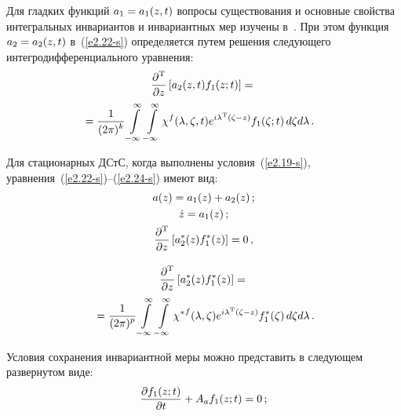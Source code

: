 \begin{multicols}{2}
Для гладких функций $a_1\hm=a_1(z,t)$ вопросы существования и основные
свойства интегральных инвариантов и инвариантных мер изучены в~\cite{23-s, 24-s}.
При этом  функция $a_2 \hm= a_2(z,t)$ в~(\ref{e2.22-s})
определяется путем решения следующего интегродифференциального уравнения:
    \begin{multline}
    \fr{\prt^{\mathrm{T}}}{\prt z}\lk a_2 (z,t) f_1(z;t) \rk ={}\\
    \hspace*{-4mm}{}=
    \fr{1}{(2\pi)^k} \iin\iin \chi^f
    (\la,\zeta,t) e^{i\la^{\mathrm{T}}(\zeta-z)} f_1(\zeta;t) \,d\zeta d\la\,.\!
    \label{e2.25-s}
    \end{multline}

Для стационарных ДСтС, когда выполнены условия~(\ref{e2.19-s}),
уравнения~(\ref{e2.22-s})--(\ref{e2.24-s}) имеют вид:
    \begin{gather}
    a(z)= a_1(z) + a_2(z)\,;\label{e2.26-s}
\\
    \dot z = a_1(z)\,;\label{e2.27-s}
\\
    \displaystyle\frac{\displaystyle \partial^{\mathrm{T}}\mathstrut}{\displaystyle \partial z\mathstrut}\left[ a_2^*(z) f_1^*(z)\right] = 0\,,
    \label{e2.28-s}
\end{gather}

\vspace*{-12pt}

\noindent
\begin{multline}
\displaystyle\frac{\displaystyle \partial^{\mathrm{T}}\mathstrut}{\displaystyle \partial z\mathstrut}\left[ a_2^*(z) f_1^*(z)\right] ={}\\
{}= \displaystyle\frac{\displaystyle 1\mathstrut}{\displaystyle (2\pi)^p\mathstrut}
    \int\limits_{-\infty}^\infty \int\limits_{-\infty}^\infty {\chi^*}^f (\lambda,\zeta) e^{i\lambda^{\mathrm{T}}(\zeta-z)} f_1^*(\zeta)\, d\zeta d\lambda\,.
    \label{e2.29-s}
\end{multline}

Условия сохранения инвариантной меры можно представить в следующем
развернутом виде:
    \begin{equation*}
    \displaystyle\frac{\displaystyle \partial f_1 (z;t)\mathstrut}{\displaystyle \partial t\mathstrut} + A_a f_1 (z;t) =0\,;
    \end{equation*}

\vspace*{-12pt}


\end{multicols}
